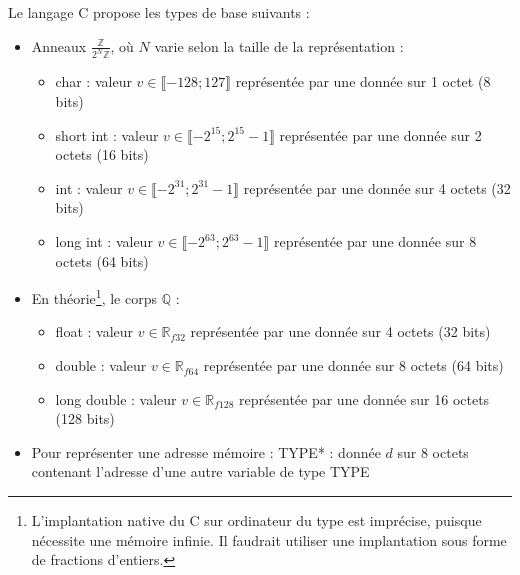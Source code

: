 \documentclass[../../../main.tex]{subfiles}
\begin{document}
Le langage C propose les types de base suivants :
\begin{itemize}
\item Anneaux $\frac{\mathbb{Z}}{2^N\mathbb{Z}}$, où $N$ varie selon la taille de la représentation :
\begin{itemize}
	\item \textsf{char} : valeur $v\in{\llbracket-128; 127\rrbracket}$ représentée par une donnée sur 1 octet (8 bits) 
	\item \textsf{short int} : valeur $v\in{\llbracket-2^{15}; 2^{15}-1\rrbracket}$ représentée par une donnée sur 2 octets (16 bits) 
	\item \textsf{int} : valeur $v\in{\llbracket-2^{31}; 2^{31}-1\rrbracket}$ représentée par une donnée sur 4 octets (32 bits) 
	\item \textsf{long int} : valeur $v\in{\llbracket-2^{63}; 2^{63}-1\rrbracket}$ représentée par une donnée sur 8 octets (64 bits)
\end{itemize}
\item En théorie\footnote{ L'implantation native du C sur ordinateur du type est imprécise, puisque nécessite une mémoire infinie. Il faudrait utiliser une implantation sous forme de fractions d'entiers.}, le corps $\mathbb{Q}$ :
\begin{itemize}
	\item \textsf{float} : valeur $v\in{\mathbb{R}_{f32}}$ représentée par une donnée sur 4 octets (32 bits)
	\item \textsf{double} : valeur $v\in{\mathbb{R}_{f64}}$ représentée par une donnée sur 8 octets (64 bits)
	\item \textsf{long double} : valeur $v\in{\mathbb{R}_{f128}}$ représentée par une donnée sur 16 octets (128 bits)
\end{itemize}
\item Pour représenter une adresse mémoire : \textsf{TYPE*} : donnée $d$ sur 8 octets contenant l'adresse d'une autre variable de type \textsf{TYPE}
\end{itemize}
\end{document}

